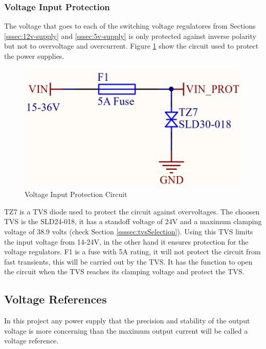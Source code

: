 		\subsubsection{Voltage Input Protection}\label{sssec:voltage-input-protection}

			The voltage that goes to each of the switching voltage regulatores from Sections \ref{sssec:12v-supply} and \ref{sssec:5v-supply} is only protected against inverse polarity but not to overvoltage and overcurrent. Figure \ref{fig:input-protection-circuit} show the circuit used to protect the power supplies.

			\begin{figure}[htbp]
				\centering
					\includegraphics[scale=0.4]{figuras/fig-input-protection-circuit.png}
				\caption{Voltage Input Protection Circuit \cite{input-protection-circuit}}
				\label{fig:input-protection-circuit}
			\end{figure}

			TZ7 is a TVS diode used to protect the circuit against overvoltages. The choosen TVS is the SLD24-018, it has a standoff voltage of 24V and a maximum clamping voltage of 38.9 volts (check Section \ref{ssssec:tvsSelection}). Using this TVS limits the input voltage from 14-24V, in the other hand it ensures protection for the voltage regulators. F1 is a fuse with 5A rating, it will not protect the circuit from fast transients, this will be carried out by the TVS. It has the function to open the circuit when the TVS reaches its clamping voltage and protect the TVS.

	\subsection{Voltage References}\label{ssec:voltage-references}

		In this project any power supply that the precision and stability of the output voltage is more concerning than the maximum output current will be called a voltage reference.


